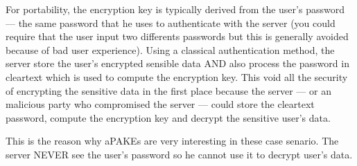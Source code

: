 \documentclass[../report.tex]{subfiles}
\begin{document}
For portability, the encryption key is typically derived from the user's password --- the same password that he uses to authenticate with the server (you could require that the user input two differents passwords but this is generally avoided because of bad user experience). Using a classical authentication method, the server store the user's encrypted sensible data AND also process the password in cleartext which is used to compute the encryption key. This void all the security of encrypting the sensitive data in the first place because the server --- or an malicious party who compromised the server --- could store the cleartext password, compute the encryption key and decrypt the sensitive user's data.

This is the reason why aPAKEs are very interesting in these case senario. The server NEVER see the user's password so he cannot use it to decrypt user's data.




















\end{document}
